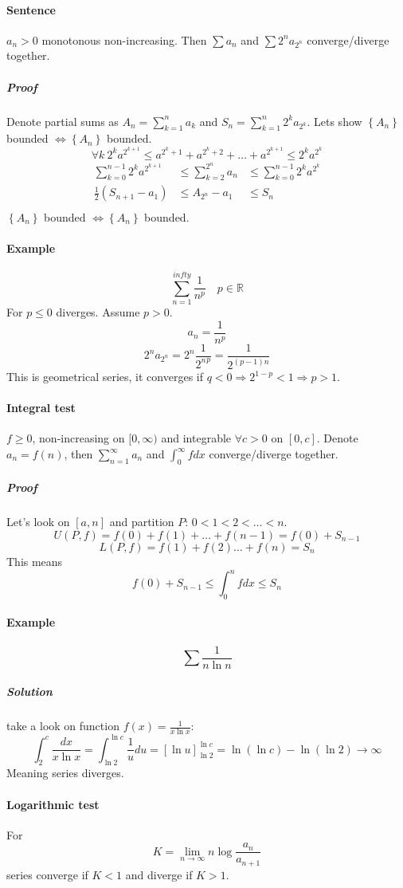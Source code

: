 \paragraph{Sentence} $a_n > 0$ monotonous non-increasing. Then $\sum a_n$ and $\sum 2^na_{2^n}$ converge/diverge together.
\subparagraph{Proof}
Denote partial sums as $A_n= \sum_{k=1}^n a_k$ and $S_n= \sum_{k=1}^n 2^ka_{2^k}$. Lets show $\left\{ A_n \right\}$ bounded $\iff \left\{ A_n \right\}$ bounded.
$$\forall k \: 2^ka^{2^{k+1}} \leq a^{2^k+1}+a^{2^k+2}+\dots+a^{2^{k+1}} \leq 2^ka^{2^k}$$
\begin{align*}
&\sum_{k=0}^{n-1} 2^ka^{2^{k+1}} &\leq \sum_{k=2}^{2^n} a_n &\leq \sum_{k=0}^{n-1} 2^ka^{2^k}&\\
&\frac{1}{2}\left(S_{n+1}-a_1\right) &\leq A_{2^n}-a_1 &\leq S_n&\\
\end{align*}
$\left\{ A_n \right\}$ bounded $\iff \left\{ A_n \right\}$ bounded.
\paragraph{Example}
$$\sum_{n=1}^{infty} \frac{1}{n^p}\quad p\in\mathbb{R}$$
For $p\leq 0$ diverges. Assume $p>0$.
$$a_n = \frac{1}{n^p}$$
$$2^na_{2^n} = 2^n \frac{1}{{2^n}^p} = \frac{1}{2^{(p-1)n}}$$
This is geometrical series, it converges if $q<0 \Rightarrow 2^{1-p} < 1 \Rightarrow p > 1$.
\paragraph{Integral test}$f\geq0$, non-increasing on $[0,\infty)$ and integrable $\forall c> 0$ on $[0,c]$. Denote $a_n = f(n)$, then $\sum_{n=1}^\infty a_n$ and $\int_0^\infty f dx$ converge/diverge together.
\subparagraph{Proof}
Let's look on $[a,n]$ and partition $P$: $0<1<2<\dots<n$.
$$U(P,f) = f(0)+f(1)+\dots+f(n-1) = f(0)+S_{n-1}$$
$$L(P,f) = f(1)+f(2)\dots+f(n) = S_n$$
This means
$$f(0)+S_{n-1} \leq \int_0^n f dx \leq S_n  $$
\paragraph{Example}
$$\sum \frac{1}{n\ln n}$$
\subparagraph{Solution}
take a look on function $f(x) = \frac{1}{x\ln x}$:
$$\int_2^c \frac{dx}{x\ln x} = \int_{\ln 2}^{\ln c} \frac{1}{u} du = \left[ \ln u \right]_{\ln 2}^{\ln c} = \ln(\ln c) - \ln(\ln 2) \to \infty$$
Meaning series diverges.
\paragraph{Logarithmic test} For $$K = \lim_{n\to \infty} n \log \frac{a_{n}}{a_{n+1}}$$ series converge if $K<1$ and diverge if $K>1$.
